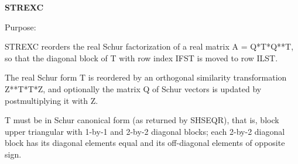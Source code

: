 {\bfseries S\+T\+R\+E\+X\+C} 

 \begin{DoxyParagraph}{Purpose\+: }
\begin{DoxyVerb} STREXC reorders the real Schur factorization of a real matrix
 A = Q*T*Q**T, so that the diagonal block of T with row index IFST is
 moved to row ILST.

 The real Schur form T is reordered by an orthogonal similarity
 transformation Z**T*T*Z, and optionally the matrix Q of Schur vectors
 is updated by postmultiplying it with Z.

 T must be in Schur canonical form (as returned by SHSEQR), that is,
 block upper triangular with 1-by-1 and 2-by-2 diagonal blocks; each
 2-by-2 diagonal block has its diagonal elements equal and its
 off-diagonal elements of opposite sign.\end{DoxyVerb}
 
\end{DoxyParagraph}

